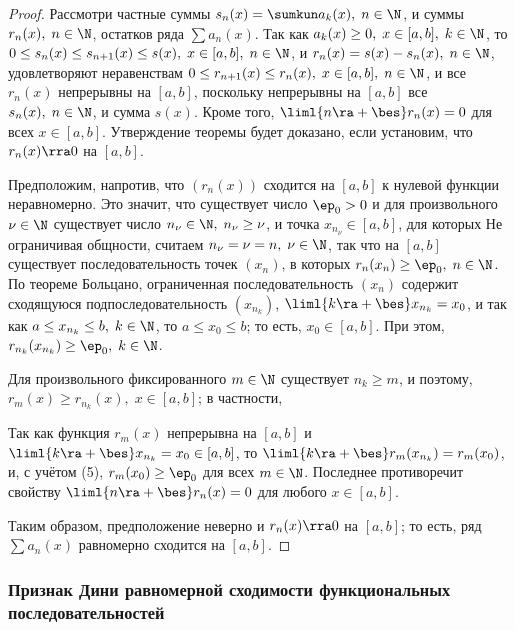\documentclass[a4paper]{article}
\begin{document}
\begin{proof}
Рассмотри частные суммы $s_n(x) = \sumkun a_k(x), \; n\in\N$, и
суммы $r_n(x), \; n\in\N$, остатков ряда $\sum a_n(x)$. Так как
$a_k(x)\ge0, \; x\in[a,b], \; k\in\N$, то $0\le s_n(x) \le
s_{n+1}(x) \le s(x), \; x\in[a,b], \; n\in\N$, и $r_n(x)=s(x) -
s_n(x), \; n\in\N$, удовлетворяют неравенствам $0\le r_{n+1}(x) \le
r_n(x), \; x\in[a,b], \; n\in\N$, и все $r_n(x)$ непрерывны на
$[a,b]$, поскольку непрерывны на $[a,b]$ все $s_n(x), \; n\in\N$, и
сумма $s(x)$. Кроме того, $\liml{n\ra+\bes}r_n(x)=0$ для всех $x\in
[a,b]$. Утверждение теоремы будет доказано, если установим, что
$r_n(x)\rra0$ на $[a,b]$.

Предположим, напротив, что $(r_n(x))$ сходится на $[a,b]$ к нулевой
функции неравномерно. Это значит, что существует число $\ep_0>0$ и
для произвольного $\nu\in\N$ существует число $n_{\nu}\in\N, \;
n_{\nu} \ge \nu$, и точка $x_{n_{\nu}}\in[a,b]$, для которых
 Не ограничивая общности, считаем $n_{\nu} = \nu
= n, \; \nu\in\N$, так что на $[a,b]$ существует последовательность
точек $(x_n)$, в которых $r_n(x_n) \ge \ep_0, \; n\in\N$. По теореме
Больцано, ограниченная последовательность $(x_n)$ содержит
сходящуюся подпоследовательность $(x_{n_k})$, $\liml{k\ra+\bes}
x_{n_k} = x_0$, и так как $a\le x_{n_k} \le b, \; k\in\N$, то $a\le
x_0 \le b$; то есть, $x_0\in[a,b]$. При этом, $r_{n_k} (x_{n_k})
\ge\ep_0, \; k\in\N$.

Для произвольного фиксированного $m\in\N$ существует $n_k\ge m$, и
поэтому, $r_m(x)\ge r_{n_k}(x), \; x\in[a,b]$; в частности,

Так как функция $r_m(x)$ непрерывна на $[a,b]$ и $\liml{k\ra+\bes}
x_{n_k} = x_0\in[a,b]$, то $\liml{k\ra+\bes} r_m(x_{n_k}) =
r_m(x_0)$, и, с учётом (5), $r_m(x_0) \ge \ep_0$ для всех $m\in\N$.
Последнее противоречит свойству $\liml{n\ra+\bes} r_n(x)=0$ для
любого $x\in[a,b]$.

Таким образом, предположение неверно и $r_n(x)\rra0$ на $[a,b]$; то
есть, ряд $\sum a_n(x)$ равномерно сходится на $[a,b]$.
\end{proof}

\subsubsection{Признак Дини равномерной сходимости функциональных
последовательностей}
\end{document}
